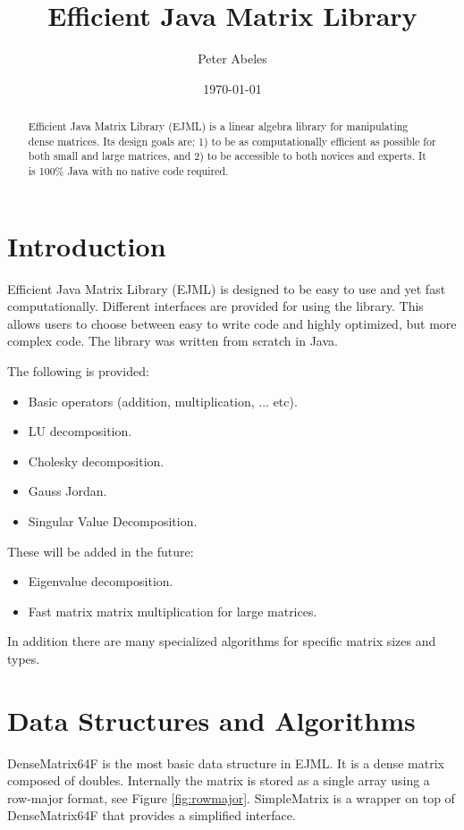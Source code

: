 \documentclass[12pt]{article}%
\title{Efficient Java Matrix Library}
\author{Peter Abeles}
\date{\today}
\begin{document}
\maketitle

\tableofcontents

\begin{abstract}
Efficient Java Matrix Library (EJML) is a linear algebra library for manipulating dense matrices. Its design goals are; 1) to be as computationally efficient as possible for both small and large matrices, and 2) to be accessible to both novices and experts.  It is 100\% Java with no native code required.
\end{abstract}


\section{Introduction}
Efficient Java Matrix Library (EJML) is designed to be easy to use and yet fast computationally.  Different interfaces are provided for using the library.  This allows users to choose between easy to write code and highly optimized, but more complex code.  The library was written from scratch in Java.

The following is provided:
\begin{itemize}
\item Basic operators (addition, multiplication, ... etc).
\item LU decomposition.
\item Cholesky decomposition.
\item Gauss Jordan.
\item Singular Value Decomposition.
\end{itemize}

These will be added in the future:
\begin{itemize}
\item Eigenvalue decomposition.
\item Fast matrix matrix multiplication for large matrices.
\end{itemize}

In addition there are many specialized algorithms for specific matrix sizes and types.  

\section{Data Structures and Algorithms}
\label{sec:structures}

DenseMatrix64F is the most basic data structure in EJML.  It is a dense matrix composed of doubles.  Internally the matrix is stored as a single array using a row-major format, see Figure \ref{fig:rowmajor}.  SimpleMatrix is a wrapper on top of DenseMatrix64F that provides a simplified interface.
\end{document}
